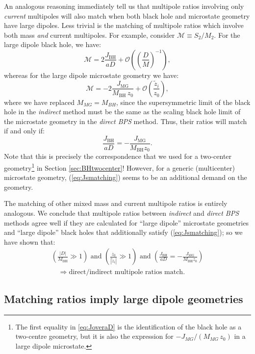 \documentclass[12pt,a4paper]{article}
\newcommand{\be}{\begin{equation}}
\newcommand{\ee}{\end{equation}}
\def\indirect{\emph{indirect} }
\def\direct{\emph{direct BPS} }
\begin{document}
An analogous reasoning immediately tell us that multipole ratios involving only \emph{current} multipoles will also match when both black hole and microstate geometry have large dipoles. Less trivial is the matching of multipole ratios which involve both mass \emph{and} current multipoles. For example, consider $\mathcal{M}\equiv S_2/M_2$. For the large dipole black hole, we have:
\be \label{eq:lDipIndirectMom1} \mathcal{M} = 2 \frac{J_{\text{BH}}}{a D} + \mathcal{O}\left(\left(\frac{D}{M}\right)^{-1}\right),\ee
whereas for the large dipole microstate geometry we have:
\be \label{eq:lDipIndirectMom2} \mathcal{M} = -2 \frac{J_{\text{MG}}}{M_\text{BH}\,z_0} + \mathcal{O}\left(\frac{\tilde z_i}{z_0}\right),\ee
where we have replaced $M_{MG}=M_{BH}$, since the supersymmetric limit of the black hole in the \indirect method must be the same as the scaling black hole limit of the microstate geometry in the \direct method.
Thus, their ratios will match if and only if:
\be \label{eq:Jsmatching} \frac{J_\text{BH}}{aD} = -\frac{J_{\text{MG}}}{M_\text{BH}z_0} .\ee
Note that this is precisely the correspondence that we used for a two-center geometry\footnote{The first equality in \eqref{eq:JoveraD} is the identification of the black hole as a two-centre geometry, but it is also the expression for $-J_{MG}/(M_{MG}\,z_0)$ in a large dipole microstate.} in Section \ref{sec:BHtwocenter}! However, for a generic (multicenter) microstate geometry, (\ref{eq:Jsmatching}) seems to be an additional demand on the geometry.

The matching of other mixed mass and current multipole ratios is entirely analogous.
%
We conclude that multipole ratios between \indirect and \direct methods agree well if they are calculated for ``large dipole'' microstate geometries and ``large dipole'' black holes that additionally satisfy (\ref{eq:Jsmatching}); so we have shown that:
\be \begin{aligned} \label{eq:conjForward} \left(\frac{|D|}{M_\text{BH}}\gg 1\right) \text{ and } \left(\frac{z_0}{|\tilde z_i|}\gg 1\right) \text{ and } \left(\frac{J_\text{BH}}{aD} = -\frac{J_{\text{MG}}}{M_\text{BH}z_0}\right)\\
 \quad \Rightarrow \text{direct/indirect multipole ratios match}.
 \end{aligned}\ee

 
 
\subsection{Matching ratios imply large dipole geometries}\label{sec:3centres}
\end{document}

